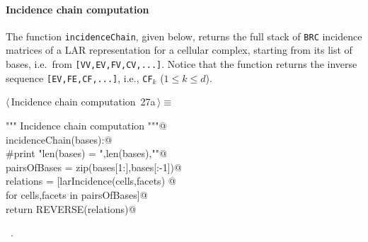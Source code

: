 \documentclass[11pt,oneside]{article}	%
\begin{document}
\paragraph{Incidence chain computation}
The function \texttt{incidenceChain}, given below, returns the full stack of \texttt{BRC} incidence matrices of a LAR representation for a cellular complex, starting from its list of bases, i.e.~from \texttt{[VV,EV,FV,CV,...]}. Notice that the function returns the inverse sequence 
\texttt{[EV,FE,CF,...]}, i.e., \texttt{CF}$_k$ ($1\leq k\leq d$).

\begin{flushleft} \small \label{scrap44}
\protect{}$\langle\,$Incidence chain computation\nobreak\ {\footnotesize 27a}$\,\rangle\equiv$
\vspace{-1ex}
\begin{list}{}{} \item
\mbox{}\verb@""" Incidence chain computation """@\\
\mbox{}\verb@def incidenceChain(bases):@\\
\mbox{}\verb@   #print "\n len(bases) = ",len(bases),"\n"@\\
\mbox{}\verb@   pairsOfBases = zip(bases[1:],bases[:-1])@\\
\mbox{}\verb@   relations = [larIncidence(cells,facets) @\\
\mbox{}\verb@               for cells,facets in pairsOfBases]@\\
\mbox{}\verb@   return REVERSE(relations)@\\
\mbox{}\verb@@{\NWsep}
\end{list}
\vspace{-1ex}
\footnotesize\addtolength{\baselineskip}{-1ex}
\begin{list}{}{\setlength{\itemsep}{-\parsep}\setlength{\itemindent}{-\leftmargin}}
\item \NWtxtMacroRefIn\ .
\end{list}
\end{flushleft}
\end{document}
